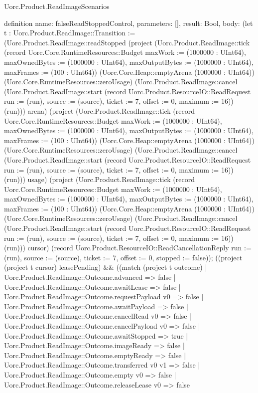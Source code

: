 \begin{lexlean}{Uorc.Product.ReadImageScenarios}
\begin{semanticmodule}
definition{
  name: falseReadStoppedControl,
  parameters: [],
  result: Bool,
  body: (let t : Uorc.Product.ReadImage::Transition := (Uorc.Product.ReadImage::readStopped (project (Uorc.Product.ReadImage::tick (record Uorc.Core.RuntimeResources::Budget {maxWork := (1000000 : UInt64), maxOwnedBytes := (1000000 : UInt64), maxOutputBytes := (1000000 : UInt64), maxFrames := (100 : UInt64)}) (Uorc.Core.Heap::emptyArena (1000000 : UInt64)) (Uorc.Core.RuntimeResources::zeroUsage) (Uorc.Product.ReadImage::cancel (Uorc.Product.ReadImage::start (record Uorc.Product.ResourceIO::ReadRequest {run := (run), source := (source), ticket := 7, offset := 0, maximum := 16})) (run))) arena) (project (Uorc.Product.ReadImage::tick (record Uorc.Core.RuntimeResources::Budget {maxWork := (1000000 : UInt64), maxOwnedBytes := (1000000 : UInt64), maxOutputBytes := (1000000 : UInt64), maxFrames := (100 : UInt64)}) (Uorc.Core.Heap::emptyArena (1000000 : UInt64)) (Uorc.Core.RuntimeResources::zeroUsage) (Uorc.Product.ReadImage::cancel (Uorc.Product.ReadImage::start (record Uorc.Product.ResourceIO::ReadRequest {run := (run), source := (source), ticket := 7, offset := 0, maximum := 16})) (run))) usage) (project (Uorc.Product.ReadImage::tick (record Uorc.Core.RuntimeResources::Budget {maxWork := (1000000 : UInt64), maxOwnedBytes := (1000000 : UInt64), maxOutputBytes := (1000000 : UInt64), maxFrames := (100 : UInt64)}) (Uorc.Core.Heap::emptyArena (1000000 : UInt64)) (Uorc.Core.RuntimeResources::zeroUsage) (Uorc.Product.ReadImage::cancel (Uorc.Product.ReadImage::start (record Uorc.Product.ResourceIO::ReadRequest {run := (run), source := (source), ticket := 7, offset := 0, maximum := 16})) (run))) cursor) (record Uorc.Product.ResourceIO::ReadCancellationReply {run := (run), source := (source), ticket := 7, offset := 0, stopped := false})); ((project (project t cursor) leasePending) && ((match (project t outcome)
    | Uorc.Product.ReadImage::Outcome.advanced => false
    | Uorc.Product.ReadImage::Outcome.awaitLease => false
    | Uorc.Product.ReadImage::Outcome.requestPayload v0 => false
    | Uorc.Product.ReadImage::Outcome.awaitPayload => false
    | Uorc.Product.ReadImage::Outcome.cancelRead v0 => false
    | Uorc.Product.ReadImage::Outcome.cancelPayload v0 => false
    | Uorc.Product.ReadImage::Outcome.awaitStopped => true
    | Uorc.Product.ReadImage::Outcome.imageReady => false
    | Uorc.Product.ReadImage::Outcome.emptyReady => false
    | Uorc.Product.ReadImage::Outcome.transferred v0 v1 => false
    | Uorc.Product.ReadImage::Outcome.empty v0 => false
    | Uorc.Product.ReadImage::Outcome.releaseLease v0 => false
}
\end{semanticmodule}
\end{lexlean}
